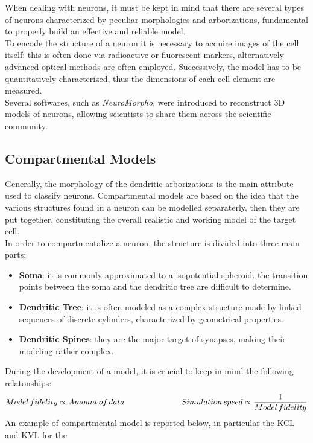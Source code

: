 When dealing with neurons, it must be kept in mind that there are several types of
neurons characterized by peculiar morphologies and arborizations, fundamental
to properly build an effective and reliable model.\\
To encode the structure of a neuron it is necessary to acquire images of the cell itself:
this is often done via radioactive or fluorescent markers, alternatively advanced optical
methods are often employed. Successively, the model has to be quantitatively characterized,
thus the dimensions of each cell element are measured.\\
Several softwares, such as \textit{NeuroMorpho}, were introduced to reconstruct 3D models of
neurons, allowing scientists to share them across the scientific community.

\subsection{Compartmental Models}
Generally, the morphology of the dendritic arborizations is the main attribute used to classify
neurons. Compartmental models are based on the idea that the various structures found in
a neuron can be modelled separaterly, then they are put together, constituting the
overall realistic and working model of the target cell.\\
In order to compartmentalize a neuron, the structure is divided into three main parts:
\begin{itemize}
    \item \textbf{Soma}: it is commonly approximated to a isopotential spheroid. the
          transition points between the soma and the dendritic tree are difficult to determine.
    \item \textbf{Dendritic Tree}: it is often modeled as a complex structure made by
          linked sequences of discrete cylinders, characterized by geometrical properties.
    \item  \textbf{Dendritic Spines}: they are the major target of synapses, making their
          modeling rather complex.
\end{itemize}
During the development of a model, it is crucial to keep in mind the following relatonships:
\begin{equation*}
    {Model\,fidelity}\propto{Amount\,of\,data}
    \hspace{2.5cm}
    {Simulation\,speed}\propto{\frac{1}{Model\,fidelity}}
\end{equation*}
An example of compartmental model is reported below, in particular the KCL and KVL for the
